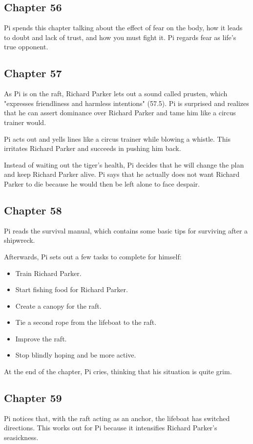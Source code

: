 \documentclass[11pt]{article}
\begin{document}
\subsection{Chapter 56}
\label{sec:orgb293d27}
Pi spends this chapter talking about the effect of fear on the body, how it leads to doubt and lack of trust, and how you must fight it. Pi regards fear as life's true opponent.
\subsection{Chapter 57}
\label{sec:org6608705}
As Pi is on the raft, Richard Parker lets out a sound called prusten, which "expresses friendliness and harmless intentions" (57.5). Pi is surprised and realizes that he can assert dominance over Richard Parker and tame him like a circus trainer would.

Pi acts out and yells lines like a circus trainer while blowing a whistle. This irritates Richard Parker and succeeds in pushing him back.

Instead of waiting out the tiger's health, Pi decides that he will change the plan and keep Richard Parker alive. Pi says that he actually does not want Richard Parker to die because he would then be left alone to face despair.
\subsection{Chapter 58}
\label{sec:org398c5ff}
Pi reads the survival manual, which contains some basic tips for surviving after a shipwreck.

Afterwards, Pi sets out a few tasks to complete for himself:

\begin{itemize}
\item Train Richard Parker.
\item Start fishing food for Richard Parker.
\item Create a canopy for the raft.
\item Tie a second rope from the lifeboat to the raft.
\item Improve the raft.
\item Stop blindly hoping and be more active.
\end{itemize}

At the end of the chapter, Pi cries, thinking that his situation is quite grim.
\subsection{Chapter 59}
\label{sec:orgabf9112}
Pi notices that, with the raft acting as an anchor, the lifeboat has switched directions. This works out for Pi because it intensifies Richard Parker's seasickness.
\end{document}

